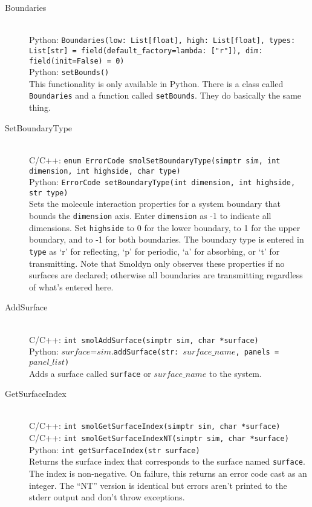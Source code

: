 \documentclass {scrbook}
\newcommand {\ttt} {\texttt}
\begin{document}
\begin{description}

\item[Boundaries]
\hfill \\
Python: \ttt{Boundaries(low: List[float], high: List[float], types: List[str] = field(default\_factory=lambda: ["r"]), dim: field(init=False) = 0)}\\
Python: \ttt{setBounds()}\\
This functionality is only available in Python. There is a class called \ttt{Boundaries} and a function called \ttt{setBounds}. They do basically the same thing.

\item[SetBoundaryType]
\hfill \\
C/C++: \ttt{enum ErrorCode smolSetBoundaryType(simptr sim, int dimension, int highside, char type)}\\
Python: \ttt{ErrorCode setBoundaryType(int dimension, int highside, str type)}\\
Sets the molecule interaction properties for a system boundary that bounds the \ttt{dimension} axis. Enter \ttt{dimension} as -1 to indicate all dimensions. Set \ttt{highside} to 0 for the lower boundary, to 1 for the upper boundary, and to -1 for both boundaries. The boundary type is entered in \ttt{type} as `r' for reflecting, `p' for periodic, `a' for absorbing, or `t' for transmitting. Note that Smoldyn only observes these properties if no surfaces are declared; otherwise all boundaries are transmitting regardless of what's entered here.

\item[AddSurface]
\hfill \\
C/C++: \ttt{int smolAddSurface(simptr sim, char *surface)}\\
Python: $surface$=$sim$.\ttt{addSurface(str: $surface\_name$, panels = $panel\_list$)}\\
Adds a surface called \ttt{surface} or $surface\_name$ to the system.

\item[GetSurfaceIndex]
\hfill \\
C/C++: \ttt{int smolGetSurfaceIndex(simptr sim, char *surface)}\\
C/C++: \ttt{int smolGetSurfaceIndexNT(simptr sim, char *surface)}\\
Python: \ttt{int getSurfaceIndex(str surface)}\\
Returns the surface index that corresponds to the surface named \ttt{surface}. The index is non-negative. On failure, this returns an error code cast as an integer. The ``NT'' version is identical but errors aren't printed to the stderr output and don't throw exceptions.


\end{description}
\end{document}

